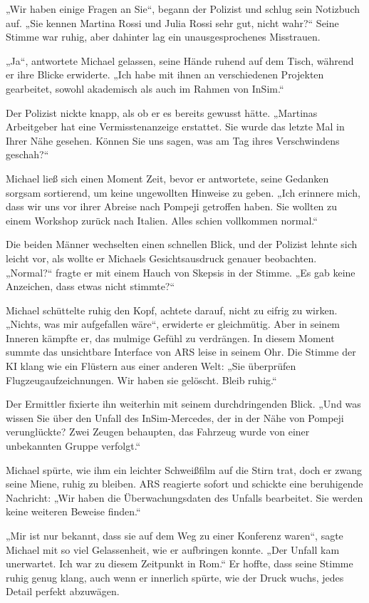 \documentclass[
]{article}
\begin{document}
„Wir haben einige Fragen an Sie``, begann der Polizist und schlug sein
Notizbuch auf. „Sie kennen Martina Rossi und Julia Rossi sehr gut, nicht
wahr?{\kern0pt}`` Seine Stimme war ruhig, aber dahinter lag ein
unausgesprochenes Misstrauen.

„Ja``, antwortete Michael gelassen, seine Hände ruhend auf dem Tisch,
während er ihre Blicke erwiderte. „Ich habe mit ihnen an verschiedenen
Projekten gearbeitet, sowohl akademisch als auch im Rahmen von InSim.``

Der Polizist nickte knapp, als ob er es bereits gewusst hätte. „Martinas
Arbeitgeber hat eine Vermisstenanzeige erstattet. Sie wurde das letzte
Mal in Ihrer Nähe gesehen. Können Sie uns sagen, was am Tag ihres
Verschwindens geschah?{\kern0pt}``

Michael ließ sich einen Moment Zeit, bevor er antwortete, seine Gedanken
sorgsam sortierend, um keine ungewollten Hinweise zu geben. „Ich
erinnere mich, dass wir uns vor ihrer Abreise nach Pompeji getroffen
haben. Sie wollten zu einem Workshop zurück nach Italien. Alles schien
vollkommen normal.``

Die beiden Männer wechselten einen schnellen Blick, und der Polizist
lehnte sich leicht vor, als wollte er Michaels Gesichtsausdruck genauer
beobachten. „Normal?{\kern0pt}`` fragte er mit einem Hauch von Skepsis
in der Stimme. „Es gab keine Anzeichen, dass etwas nicht
stimmte?{\kern0pt}``

Michael schüttelte ruhig den Kopf, achtete darauf, nicht zu eifrig zu
wirken. „Nichts, was mir aufgefallen wäre``, erwiderte er gleichmütig.
Aber in seinem Inneren kämpfte er, das mulmige Gefühl zu verdrängen. In
diesem Moment summte das unsichtbare Interface von ARS leise in seinem
Ohr. Die Stimme der KI klang wie ein Flüstern aus einer anderen Welt:
„Sie überprüfen Flugzeugaufzeichnungen. Wir haben sie gelöscht. Bleib
ruhig.``

Der Ermittler fixierte ihn weiterhin mit seinem durchdringenden Blick.
„Und was wissen Sie über den Unfall des InSim-Mercedes, der in der Nähe
von Pompeji verunglückte? Zwei Zeugen behaupten, das Fahrzeug wurde von
einer unbekannten Gruppe verfolgt.``

Michael spürte, wie ihm ein leichter Schweißfilm auf die Stirn trat,
doch er zwang seine Miene, ruhig zu bleiben. ARS reagierte sofort und
schickte eine beruhigende Nachricht: „Wir haben die Überwachungsdaten
des Unfalls bearbeitet. Sie werden keine weiteren Beweise finden.``

„Mir ist nur bekannt, dass sie auf dem Weg zu einer Konferenz waren``,
sagte Michael mit so viel Gelassenheit, wie er aufbringen konnte. „Der
Unfall kam unerwartet. Ich war zu diesem Zeitpunkt in Rom.`` Er hoffte,
dass seine Stimme ruhig genug klang, auch wenn er innerlich spürte, wie
der Druck wuchs, jedes Detail perfekt abzuwägen.
\end{document}
